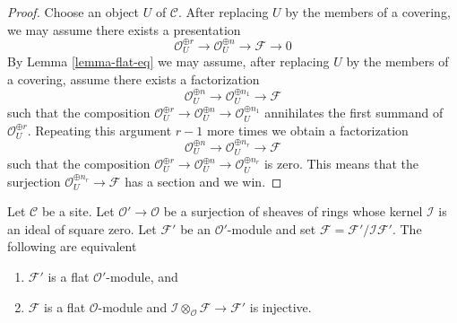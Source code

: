\begin{proof}
Choose an object $U$ of $\mathcal{C}$.
After replacing $U$ by the members of a covering, we may
assume there exists a presentation
$$
\mathcal{O}_U^{\oplus r} \to
\mathcal{O}_U^{\oplus n} \to \mathcal{F} \to 0
$$
By Lemma \ref{lemma-flat-eq} we may assume, after replacing $U$ by the members
of a covering, assume there exists a factorization
$$
\mathcal{O}_U^{\oplus n} \to
\mathcal{O}_U^{\oplus n_1} \to \mathcal{F}
$$
such that the composition
$\mathcal{O}_U^{\oplus r} \to \mathcal{O}_U^{\oplus n} \to
\mathcal{O}_U^{\oplus n_1}$
annihilates the first summand of $\mathcal{O}_U^{\oplus r}$.
Repeating this argument $r - 1$ more times we obtain a factorization
$$
\mathcal{O}_U^{\oplus n} \to
\mathcal{O}_U^{\oplus n_r} \to \mathcal{F}
$$
such that the composition
$\mathcal{O}_U^{\oplus r} \to \mathcal{O}_U^{\oplus n}
\to \mathcal{O}_U^{\oplus n_r}$ is zero.
This means that the surjection $\mathcal{O}_U^{\oplus n_r} \to \mathcal{F}$
has a section and we win.
\end{proof}

\begin{lemma}
\label{lemma-flat-over-thickening}
Let $\mathcal{C}$ be a site. Let $\mathcal{O}' \to \mathcal{O}$
be a surjection of sheaves of rings whose kernel $\mathcal{I}$ is
an ideal of square zero. Let $\mathcal{F}'$ be an $\mathcal{O}'$-module
and set $\mathcal{F} = \mathcal{F}'/\mathcal{I}\mathcal{F}'$.
The following are equivalent
\begin{enumerate}
\item $\mathcal{F}'$ is a flat $\mathcal{O}'$-module, and
\item $\mathcal{F}$ is a flat $\mathcal{O}$-module and
$\mathcal{I} \otimes_\mathcal{O} \mathcal{F} \to \mathcal{F}'$
is injective.
\end{enumerate}
\end{lemma}


